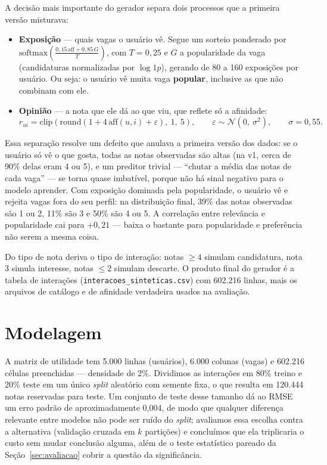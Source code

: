 \documentclass[12pt,a4paper]{article}
\begin{document}
A decisão mais importante do gerador separa dois processos que a primeira versão misturava:

\begin{itemize}
    \item \textbf{Exposição} --- quais vagas o usuário vê. Segue um sorteio ponderado por $\text{softmax}\left(\frac{0{,}15\,\text{aff} + 0{,}85\,G}{T}\right)$, com $T = 0{,}25$ e $G$ a popularidade da vaga (candidaturas normalizadas por $\log 1p$), gerando de 80 a 160 exposições por usuário. Ou seja: o usuário vê muita vaga \textbf{popular}, inclusive as que não combinam com ele.
    \item \textbf{Opinião} --- a nota que ele dá ao que viu, que reflete só a afinidade:
    \begin{equation}
    r_{ui} = \text{clip}\left(\text{round}\left(1 + 4\,\text{aff}(u,i) + \varepsilon\right),\ 1,\ 5\right), \qquad \varepsilon \sim \mathcal{N}(0,\ \sigma^2), \qquad \sigma = 0{,}55.
    \end{equation}
\end{itemize}

Essa separação resolve um defeito que anulava a primeira versão dos dados: se o usuário só vê o que gosta, todas as notas observadas são altas (na v1, cerca de 90\% delas eram 4 ou 5), e um preditor trivial --- ``chutar a média das notas de cada vaga'' --- se torna quase imbatível, porque não há sinal negativo para o modelo aprender. Com exposição dominada pela popularidade, o usuário vê e rejeita vagas fora do seu perfil: na distribuição final, 39\% das notas observadas são 1 ou 2, 11\% são 3 e 50\% são 4 ou 5. A correlação entre relevância e popularidade cai para $+0{,}21$ --- baixa o bastante para popularidade e preferência não serem a mesma coisa.

Do tipo de nota deriva o tipo de interação: notas $\geq 4$ simulam candidatura, nota 3 simula interesse, notas $\leq 2$ simulam descarte. O produto final do gerador é a tabela de interações (\texttt{interacoes\_sinteticas.csv}) com 602.216 linhas, mais os arquivos de catálogo e de afinidade verdadeira usados na avaliação.

\section{Modelagem}\label{sec:modelagem}

A matriz de utilidade tem 5.000 linhas (usuários), 6.000 colunas (vagas) e 602.216 células preenchidas --- densidade de 2\%. Dividimos as interações em 80\% treino e 20\% teste em um único \textit{split} aleatório com semente fixa, o que resulta em 120.444 notas reservadas para teste. Um conjunto de teste desse tamanho dá ao RMSE um erro padrão de aproximadamente 0,004, de modo que qualquer diferença relevante entre modelos não pode ser ruído do \textit{split}; avaliamos essa escolha contra a alternativa (validação cruzada em $k$ partições) e concluímos que ela triplicaria o custo sem mudar conclusão alguma, além de o teste estatístico pareado da Seção~\ref{sec:avaliacao} cobrir a questão da significância.
\end{document}
